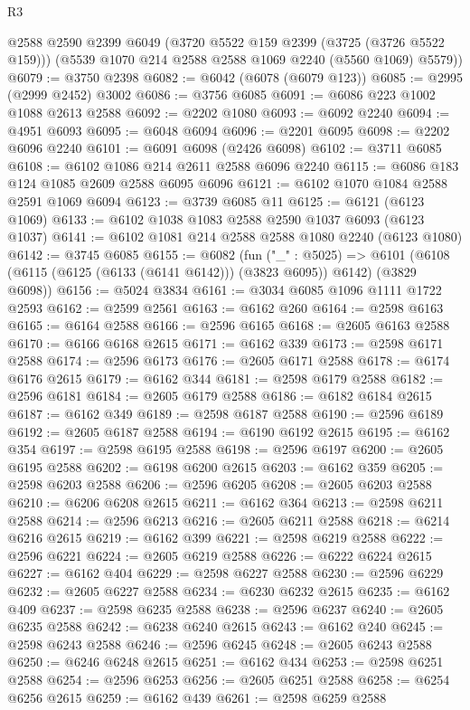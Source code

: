 \begin{lexlean}{R3}
\begin{coremodule}
      @2588
      @2590
      @2399
      @6049
      (@3720 @5522 @159 @2399 (@3725 (@3726 @5522 @159)))
      (@5539 @1070 @214 @2588 @2588 @1069 @2240 (@5560 @1069) @5579))
@6079 := @3750 @2398
@6082 := @6042 (@6078 (@6079 @123))
@6085 := @2995 (@2999 @2452) @3002
@6086 := @3756 @6085
@6091 := @6086 @223 @1002 @1088 @2613 @2588
@6092 := @2202 @1080
@6093 := @6092 @2240
@6094 := @4951 @6093
@6095 := @6048 @6094
@6096 := @2201 @6095
@6098 := @2202 @6096 @2240
@6101 := @6091 @6098 (@2426 @6098)
@6102 := @3711 @6085
@6108 := @6102 @1086 @214 @2611 @2588 @6096 @2240
@6115 := @6086 @183 @124 @1085 @2609 @2588 @6095 @6096
@6121 := @6102 @1070 @1084 @2588 @2591 @1069 @6094
@6123 := @3739 @6085 @11
@6125 := @6121 (@6123 @1069)
@6133 := @6102 @1038 @1083 @2588 @2590 @1037 @6093 (@6123 @1037)
@6141 := @6102 @1081 @214 @2588 @2588 @1080 @2240 (@6123 @1080)
@6142 := @3745 @6085
@6155 := @6082
    (fun ("_" : @5025) =>
    @6101 (@6108 (@6115 (@6125 (@6133 (@6141 @6142))) (@3823 @6095)) @6142) (@3829 @6098))
@6156 := @5024 @3834
@6161 := @3034 @6085 @1096 @1111 @1722 @2593
@6162 := @2599 @2561
@6163 := @6162 @260
@6164 := @2598 @6163
@6165 := @6164 @2588
@6166 := @2596 @6165
@6168 := @2605 @6163 @2588
@6170 := @6166 @6168 @2615
@6171 := @6162 @339
@6173 := @2598 @6171 @2588
@6174 := @2596 @6173
@6176 := @2605 @6171 @2588
@6178 := @6174 @6176 @2615
@6179 := @6162 @344
@6181 := @2598 @6179 @2588
@6182 := @2596 @6181
@6184 := @2605 @6179 @2588
@6186 := @6182 @6184 @2615
@6187 := @6162 @349
@6189 := @2598 @6187 @2588
@6190 := @2596 @6189
@6192 := @2605 @6187 @2588
@6194 := @6190 @6192 @2615
@6195 := @6162 @354
@6197 := @2598 @6195 @2588
@6198 := @2596 @6197
@6200 := @2605 @6195 @2588
@6202 := @6198 @6200 @2615
@6203 := @6162 @359
@6205 := @2598 @6203 @2588
@6206 := @2596 @6205
@6208 := @2605 @6203 @2588
@6210 := @6206 @6208 @2615
@6211 := @6162 @364
@6213 := @2598 @6211 @2588
@6214 := @2596 @6213
@6216 := @2605 @6211 @2588
@6218 := @6214 @6216 @2615
@6219 := @6162 @399
@6221 := @2598 @6219 @2588
@6222 := @2596 @6221
@6224 := @2605 @6219 @2588
@6226 := @6222 @6224 @2615
@6227 := @6162 @404
@6229 := @2598 @6227 @2588
@6230 := @2596 @6229
@6232 := @2605 @6227 @2588
@6234 := @6230 @6232 @2615
@6235 := @6162 @409
@6237 := @2598 @6235 @2588
@6238 := @2596 @6237
@6240 := @2605 @6235 @2588
@6242 := @6238 @6240 @2615
@6243 := @6162 @240
@6245 := @2598 @6243 @2588
@6246 := @2596 @6245
@6248 := @2605 @6243 @2588
@6250 := @6246 @6248 @2615
@6251 := @6162 @434
@6253 := @2598 @6251 @2588
@6254 := @2596 @6253
@6256 := @2605 @6251 @2588
@6258 := @6254 @6256 @2615
@6259 := @6162 @439
@6261 := @2598 @6259 @2588

\end{coremodule}
\end{lexlean}
